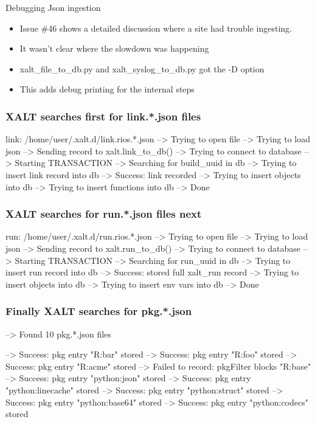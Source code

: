 \documentclass{beamer}
\begin{document}
\begin{frame}{Debugging Json ingestion}
  \begin{itemize}
    \item Issue \#46 shows a detailed discussion where a site had
      trouble ingesting.
    \item It wasn't clear where the slowdown was happening 
    \item xalt\_file\_to\_db.py and xalt\_syslog\_to\_db.py got the -D
      option 
    \item This adds debug printing for the internal steps
  \end{itemize}
\end{frame}

\begin{frame}[fragile]
    \frametitle{XALT searches first for link.*.json files}
 {\tiny
    \begin{semiverbatim}
link: /home/user/.xalt.d/link.rios.*.json
  --> Trying to open file
  --> Trying to load json
  --> Sending record to xalt.link_to_db()
  --> Trying to connect to database
  --> Starting TRANSACTION
  --> Searching for build_uuid in db
  --> Trying to insert link record into db
  --> Success: link recorded
  --> Trying to insert objects into db
  --> Trying to insert functions into db
  --> Done
    \end{semiverbatim}
}
\end{frame}


\begin{frame}[fragile]
    \frametitle{XALT searches for run.*.json files next}
 {\tiny
    \begin{semiverbatim}
run: /home/user/.xalt.d/run.rios.*.json
  --> Trying to open file
  --> Trying to load json
  --> Sending record to xalt.run_to_db()
  --> Trying to connect to database
  --> Starting TRANSACTION
  --> Searching for run_uuid in db
  --> Trying to insert run record into db
  --> Success: stored full xalt_run record
  --> Trying to insert objects into db
  --> Trying to insert env vars into db
  --> Done
    \end{semiverbatim}
}

\end{frame}

\begin{frame}[fragile]
    \frametitle{Finally XALT searches for pkg.*.json}
 {\tiny
    \begin{semiverbatim}
  --> Found 10 pkg.*.json files

  --> Success: pkg entry "R:bar" stored
  --> Success: pkg entry "R:foo" stored
  --> Success: pkg entry "R:acme" stored
  --> Failed to record: pkgFilter blocks "R:base" 
  --> Success: pkg entry "python:json" stored
  --> Success: pkg entry "python:linecache" stored
  --> Success: pkg entry "python:struct" stored
  --> Success: pkg entry "python:base64" stored
  --> Success: pkg entry "python:codecs" stored
    \end{semiverbatim}
}
\end{frame}
\end{document}
